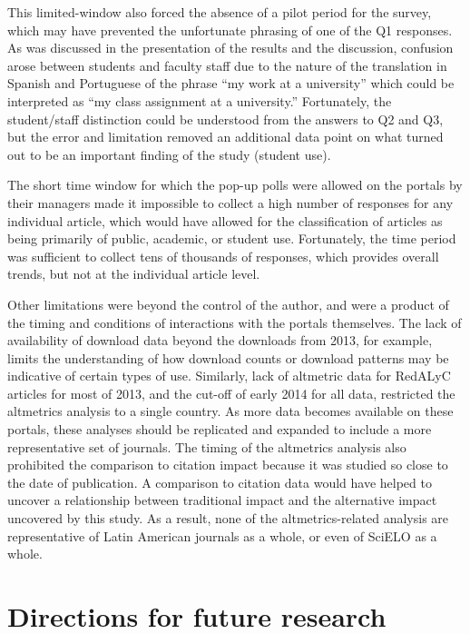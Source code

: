 This limited-window also forced the absence of a pilot period for the survey, which may have prevented the unfortunate phrasing of one of the Q1 responses. As was discussed in the presentation of the results and the discussion, confusion arose between students and faculty staff due to the nature of the translation in Spanish and Portuguese of the phrase ``my work at a university'' which could be interpreted as ``my class assignment at a university.'' Fortunately, the student\slash staff distinction could be understood from the answers to Q2 and Q3, but the error and limitation removed an additional data point on what turned out to be an important finding of the study (student use).

The short time window for which the pop-up polls were allowed on the portals by their managers made it impossible to collect a high number of responses for any individual article, which would have allowed for the classification of articles as being primarily of public, academic, or student use. Fortunately, the time period was sufficient to collect tens of thousands of responses, which provides overall trends, but not at the individual article level.

Other limitations were beyond the control of the author, and were a product of the timing and conditions of interactions with the portals themselves. The lack of availability of download data beyond the downloads from 2013, for example, limits the understanding of how download counts or download patterns may be indicative of certain types of use. Similarly, lack of altmetric data for RedALyC articles for most of 2013, and the cut-off of early 2014 for all data, restricted the altmetrics analysis to a single country. As more data becomes available on these portals, these analyses should be replicated and expanded to include a more representative set of journals. The timing of the altmetrics analysis also prohibited the comparison to citation impact because it was studied so close to the date of publication. A comparison to citation data would have helped to uncover a relationship between traditional impact and the alternative impact uncovered by this study. As a result, none of the altmetrics-related analysis are representative of Latin American journals as a whole, or even of SciELO as a whole.

\section{Directions for future research}
\label{directionsforfutureresearch}

